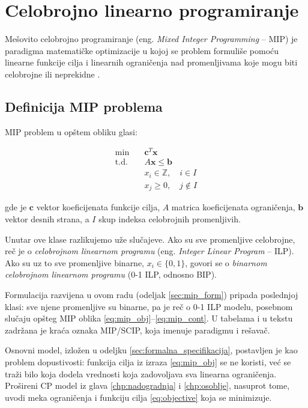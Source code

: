\documentclass[12pt,oneside]{memoir}
\begin{document}
\section{Celobrojno linearno programiranje}
\label{sec:mip}

Mešovito celobrojno programiranje (eng. \emph{Mixed Integer Programming}
-- MIP) je paradigma matematičke optimizacije u kojoj se problem
formuliše pomoću linearne funkcije cilja i linearnih ograničenja
nad promenljivama koje mogu biti celobrojne ili neprekidne
\cite{wolsey1998, nemhauser1988}.

\subsection{Definicija MIP problema}

MIP problem u opštem obliku glasi:

\begin{align}
\min \quad & \mathbf{c}^T \mathbf{x} \label{eq:mip_obj} \\
\text{t.d.} \quad & A\mathbf{x} \leq \mathbf{b} \label{eq:mip_constr} \\
& x_i \in \mathbb{Z}, \quad i \in I \label{eq:mip_int} \\
& x_j \geq 0, \quad j \notin I \label{eq:mip_cont}
\end{align}

gde je $\mathbf{c}$ vektor koeficijenata funkcije cilja, $A$ matrica
koeficijenata ograničenja, $\mathbf{b}$ vektor desnih strana, a $I$
skup indeksa celobrojnih promenljivih.

Unutar ove klase razlikujemo uže slučajeve. Ako su sve promenljive
celobrojne, reč je o
\emph{celobrojnom linearnom programu} (eng. \emph{Integer Linear
Program} -- ILP). Ako su uz to sve promenljive binarne, $x_i \in \{0,
1\}$, govori se o \emph{binarnom celobrojnom linearnom programu}
(0-1 ILP, odnosno BIP).

Formulacija razvijena u ovom radu (odeljak \ref{sec:mip_form}) pripada
poslednjoj klasi: sve njene promenljive su binarne, pa je reč o 0-1
ILP modelu, posebnom slučaju opšteg MIP oblika
\eqref{eq:mip_obj}--\eqref{eq:mip_cont}. U tabelama i u tekstu zadržana
je kraća oznaka MIP/SCIP, koja imenuje paradigmu i rešavač.

Osnovni model, izložen u odeljku \ref{sec:formalna_specifikacija}, postavljen je kao
problem dopustivosti: funkcija cilja iz izraza \eqref{eq:mip_obj} se ne
koristi, već se traži bilo koja dodela vrednosti koja zadovoljava sva
linearna ograničenja. Prošireni CP model iz glava
\ref{chp:nadogradnja} i \ref{chp:osoblje}, nasuprot tome, uvodi meka
ograničenja i funkciju cilja \eqref{eq:objective} koja se minimizuje.
\end{document}
